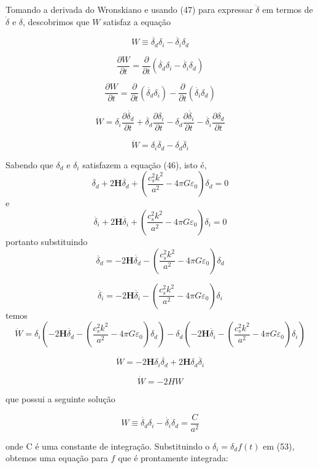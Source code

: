 \documentclass[a4paper,12pt]{article}
\begin{document}
Tomando a derivada do Wronskiano e usando (47) para expressar $\ddot{\delta}$ em termos de $\dot{\delta}$ e $\delta$, descobrimos que $W$ satisfaz a equação


$$W \equiv \dot{\delta_d} \delta_i - \dot{\delta_i} \delta_d$$

$$\dfrac{\partial W }{\partial t}= \dfrac{\partial  }{\partial t}\left(\dot{\delta_d} \delta_i - \dot{\delta_i} \delta_d \right)$$

$$\dfrac{\partial W }{\partial t}= \dfrac{\partial  }{\partial t}\left(\dot{\delta_d} \delta_i  \right)-\dfrac{\partial  }{\partial t}\left(\dot{\delta_i} \delta_d \right)$$

$$\dot{W}= \delta_i\dfrac{\partial  \dot{\delta_d}}{\partial t}+\dot{\delta_d}\dfrac{\partial \delta_i }{\partial t}-\delta_d\dfrac{\partial  \dot{\delta_i} }{\partial t}-\dot{\delta_i}\dfrac{\partial \delta_d }{\partial t}$$

$$\dot{W}= \delta_i\ddot{\delta_d}-\delta_d\ddot{\delta_i}$$

Sabendo que $\delta_d$ e $\delta_i$ satisfazem a equação (46), isto é,
$$\ddot{\delta_d} + 2\mathbf{H}\dot{\delta_d} + \left( \dfrac{c^2_s k^2}{a^2} -4\pi G\varepsilon_0\right)\delta_d = 0 $$
e
$$\ddot{\delta_i} + 2\mathbf{H}\dot{\delta_i} + \left( \dfrac{c^2_s k^2}{a^2} -4\pi G\varepsilon_0\right)\delta_i = 0$$
portanto substituindo 
$$\ddot{\delta_d} = - 2\mathbf{H}\dot{\delta_d} - \left( \dfrac{c^2_s k^2}{a^2} -4\pi G\varepsilon_0\right)\delta_d  $$

$$\ddot{\delta_i}  = - 2\mathbf{H}\dot{\delta_i} - \left( \dfrac{c^2_s k^2}{a^2} -4\pi G\varepsilon_0\right)\delta_i$$
temos
$$\dot{W}= \delta_i\left(- 2\mathbf{H}\dot{\delta_d} - \left( \dfrac{c^2_s k^2}{a^2} -4\pi G\varepsilon_0\right)\delta_d  \right)-\delta_d\left( - 2\mathbf{H}\dot{\delta_i} - \left( \dfrac{c^2_s k^2}{a^2} -4\pi G\varepsilon_0\right)\delta_i\right)$$

$$\dot{W}=  -2\mathbf{H}\delta_i\dot{\delta_d} +2\mathbf{H}\delta_d \dot{\delta_i} $$

\begin{equation}
	\dot{W} = -2H W
\end{equation}

que possui a seguinte solução

\begin{equation}
	W \equiv \dot{\delta_d} \delta_i - \dot{\delta_i} \delta_d = \dfrac{C}{a^2}
\end{equation}

onde C é uma constante de integração. Substituindo o $\delta_i = \delta_d f (t)$ em (53), obtemos uma equação para $f$ que é prontamente integrada:
\end{document}
